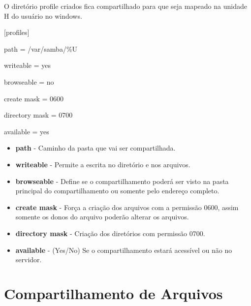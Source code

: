 



O diretório profile criados fica compartilhado para que seja mapeado na unidade H do usuário no windows.

[profiles] 

	path = /var/samba/\%U 
	
	writeable = yes 
	
	browseable = no 
	
	create mask = 0600 
	
	directory mask = 0700 
	
	available = yes 

\begin{itemize}
	\item \textbf {path} - Caminho da pasta que vai ser compartilhada.
	\item \textbf {writeable} - Permite a escrita no diretório e nos arquivos.
	\item \textbf {browseable} - Define se o compartilhamento poderá ser visto na pasta principal do compartilhamento ou somente pelo endereço completo.
	\item \textbf {create mask} - Força a criação dos arquivos com a permissão 0600, assim somente os donos do arquivo poderão alterar os arquivos.
	\item \textbf {directory mask} - Criação dos diretórios com permissão 0700.
	\item \textbf{available} - (Yes/No) Se o compartilhamento estará acessível ou não no servidor.
\end{itemize}

\section{Compartilhamento de Arquivos}

